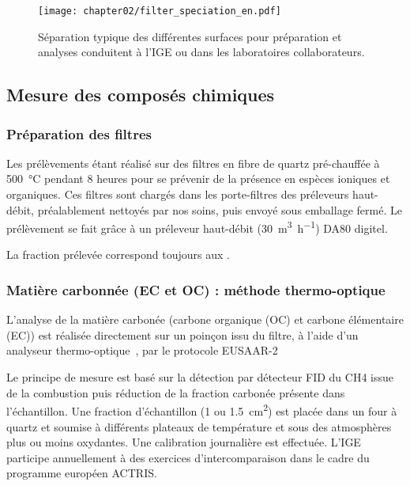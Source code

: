 \begin{figure}[ht]
    \centering
    \texttt{[image: chapter02/filter\_speciation\_en.pdf]}
    \caption{Séparation typique des différentes surfaces pour préparation et
    analyses conduitent à l'IGE ou dans les laboratoires collaborateurs.}%
    \label{fig:chapter02/filter_speciation_en}
\end{figure}

\subsection{Mesure des composés chimiques}%
\label{sub:analyses_des_composés}

\subsubsection{Préparation des filtres}%
\label{sub:préparation_des_filtres}

Les prélèvements étant réalisé sur des filtres en fibre de quartz
pré-chauffée à \SI{500}{\degreeCelsius} pendant 8 heures pour se prévenir de la présence en espèces
ioniques et organiques. Ces filtres sont chargés dans les porte-filtres des préleveurs
haut-débit, préalablement nettoyés par nos soins, puis envoyé sous emballage fermé.
Le prélèvement se fait grâce à un préleveur haut-débit (\SI{30}{\cubic\m\per\hour}) DA80
digitel.

La fraction prélevée correspond toujours aux \PMdix{}.

\subsubsection{Matière carbonnée (EC et OC) : méthode thermo-optique}%
\label{ssub:matière_carbonnée_ec_et_oc_}

L’analyse de la matière carbonée (carbone organique (OC) et carbone élémentaire (EC)) est
réalisée directement sur un poinçon issu du filtre, à l’aide d’un analyseur
thermo-optique~\autocite[Sunset Lab. Analyser]{birchElemental1996}, par le protocole
EUSAAR-2~\autocite{cavalliStandardised2010,cenAmbient2017a}

Le principe de mesure est basé sur la détection par détecteur FID du CH4 issue de la
combustion puis réduction de la fraction carbonée présente dans l’échantillon. Une
fraction d'échantillon (1 ou \SI{1.5}{\centi\m\squared}) est placée dans un four à quartz
et soumise à différents plateaux de température et sous des atmosphères plus ou moins
oxydantes. Une calibration journalière est effectuée. L’IGE participe annuellement à des
exercices d’intercomparaison dans le cadre du programme européen ACTRIS.

